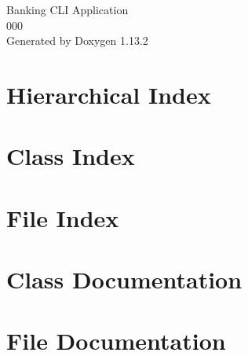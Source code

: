 \documentclass[twoside]{book}
\newcommand{\+}{\discretionary{\mbox{\scriptsize$\hookleftarrow$}}{}{}}
\newcommand{\clearemptydoublepage}{%
    \newpage{\pagestyle{empty}\cleardoublepage}%
  }
\begin{document}
  \raggedbottom
    \hypersetup{pageanchor=false,
                bookmarksnumbered=true,
                pdfencoding=unicode
               }
  \begin{titlepage}
  \vspace*{7cm}
  \begin{center}%
  {\Large Banking CLI Application}\\
  [1ex]\large 000 \\
  \vspace*{1cm}
  {\large Generated by Doxygen 1.13.2}\\
  \end{center}
  \end{titlepage}
  \clearemptydoublepage
  \tableofcontents
  \clearemptydoublepage
  \hypersetup{pageanchor=true}
\chapter{Hierarchical Index}

\chapter{Class Index}

\chapter{File Index}

\chapter{Class Documentation}








\chapter{File Documentation}





















  \backmatter
  \newpage
  \clearemptydoublepage
  \printindex
\end{document}
